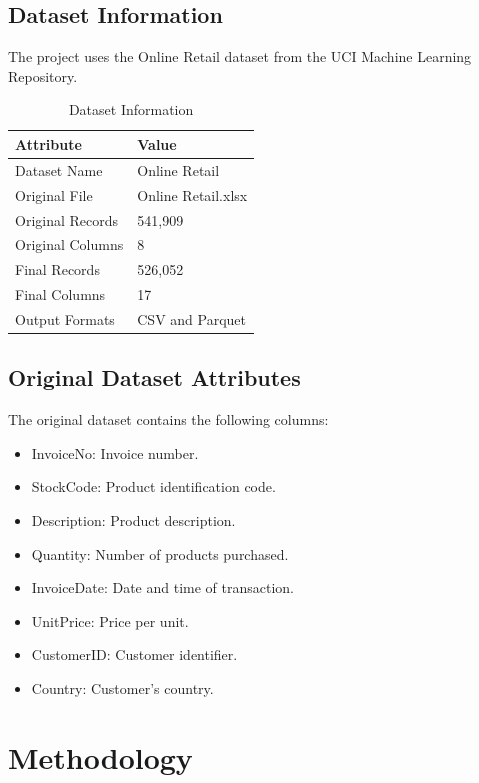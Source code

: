 \documentclass[12pt,a4paper]{report}
\begin{document}
\section{Dataset Information}

The project uses the Online Retail dataset from
the UCI Machine Learning Repository.

\begin{table}[H]
\centering
\begin{tabular}{ll}
\toprule
\textbf{Attribute} & \textbf{Value}\\
\midrule
Dataset Name & Online Retail\\
Original File & Online Retail.xlsx\\
Original Records & 541,909\\
Original Columns & 8\\
Final Records & 526,052\\
Final Columns & 17\\
Output Formats & CSV and Parquet\\
\bottomrule
\end{tabular}
\caption{Dataset Information}
\end{table}

\section{Original Dataset Attributes}

The original dataset contains the following columns:

\begin{itemize}
    \item InvoiceNo: Invoice number.
    \item StockCode: Product identification code.
    \item Description: Product description.
    \item Quantity: Number of products purchased.
    \item InvoiceDate: Date and time of transaction.
    \item UnitPrice: Price per unit.
    \item CustomerID: Customer identifier.
    \item Country: Customer's country.
\end{itemize}

\chapter{Methodology}
\end{document}
